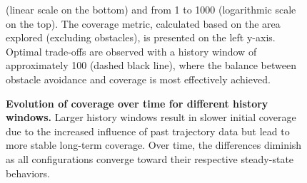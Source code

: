 \documentclass[letterpaper, 10 pt, conference, twoside]{IEEEtran}
\theoremstyle{definition}
\begin{document}
\begin{figure}[t!]
  \begin{minipage}[t!]{.26\columnwidth}
    \caption[Trade-offs between obstacle avoidance and coverage]{\textbf{Obstacle avoidance and co- verage trade-offs}. This~figure illustrates~the~relation- ship between~the size of the history window and~two key metrics:~obsta- cle avoidance and coverage.~The~col- lision metric~$e_c$ quantifies occurren- ces of constraint violations, with~the right y-axis~display- ing the invalidation ratio for various~hi- story window~sizes, from~~~25~~~to~~~225}
    \label{fig:0}
  \end{minipage}\hspace*{.3cm}
  \begin{minipage}[t!]{.7\columnwidth}
    \vspace*{-.3cm}
    
  \end{minipage}
  \vspace*{-.4cm}
  \caption*{\footnotesize (linear scale on the bottom) and from 1 to 1000 (logarithmic scale on the top). The coverage metric, calculated based on the area explored (excluding obstacles), is presented on the left y-axis. Optimal trade-offs are observed with a history window of approximately 100 (dashed black line), where the balance between obstacle avoidance and coverage is most effectively achieved.}
\end{figure}

\begin{figure}[b!]
  \vspace*{.2cm}
  \begin{minipage}[t!]{.35\columnwidth}
    \caption[.]{\textbf{Evolution of coverage over time for different history windows.} Larger history windows result in slower initial coverage due to the increased influence of past trajectory data but lead to more stable long-term coverage. Over time, the differences diminish as all configurations converge toward their respective steady-state behaviors.}
    \label{fig:time-vs-cov}
  \end{minipage}\hspace*{.63cm}
  \begin{minipage}[t!]{.6\columnwidth}
    \vspace*{-.3cm}
    \hspace*{.1cm}
  \end{minipage}
\end{figure}

\end{document}

